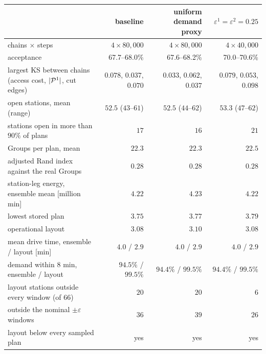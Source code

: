 \begin{tabular}{lrrr}
\toprule
 & baseline & uniform demand proxy & $\varepsilon^1=\varepsilon^2=0.25$ \\
\midrule
chains $\times$ steps & $4\times80{,}000$ & $4\times80{,}000$ & $4\times40{,}000$ \\
acceptance & 67.7--68.0\% & 67.6--68.2\% & 70.0--70.6\% \\
largest KS between chains (access cost, $|\mathcal{P}^1|$, cut edges) & $0.078$, $0.037$, $0.070$ & $0.033$, $0.062$, $0.037$ & $0.079$, $0.053$, $0.098$ \\
\midrule
open stations, mean (range) & $52.5$ ($43$--$61$) & $52.5$ ($44$--$62$) & $53.3$ ($47$--$62$) \\
stations open in more than $90\%$ of plans & $17$ & $16$ & $21$ \\
Groups per plan, mean & $22.3$ & $22.3$ & $22.5$ \\
adjusted Rand index against the real Groups & $0.28$ & $0.28$ & $0.28$ \\
\midrule
station-leg energy, ensemble mean [million min] & $4.22$ & $4.23$ & $4.22$ \\
\quad lowest stored plan & $3.75$ & $3.77$ & $3.79$ \\
\quad operational layout & $3.08$ & $3.10$ & $3.08$ \\
mean drive time, ensemble / layout [min] & $4.0$ / $2.9$ & $4.0$ / $2.9$ & $4.0$ / $2.9$ \\
demand within $8$ min, ensemble / layout & $94.5\%$ / $99.5\%$ & $94.4\%$ / $99.5\%$ & $94.4\%$ / $99.5\%$ \\
\midrule
layout stations outside every window (of $66$) & $20$ & $20$ & $6$ \\
\quad outside the nominal $\pm\varepsilon$ windows & $36$ & $39$ & $26$ \\
layout below every sampled plan & yes & yes & yes \\
\bottomrule
\end{tabular}
